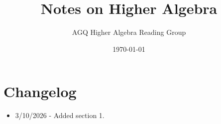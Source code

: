 \documentclass[12pt]{article}
\title{Notes on Higher Algebra}
\author{AGQ Higher Algebra Reading Group}
\date{\today}
\begin{document}
\maketitle

\section*{Changelog}
\begin{itemize}
    \item 3/10/2026 - Added section 1.
\end{itemize}

\tableofcontents

\newpage

\newpage

%

\end{document}
